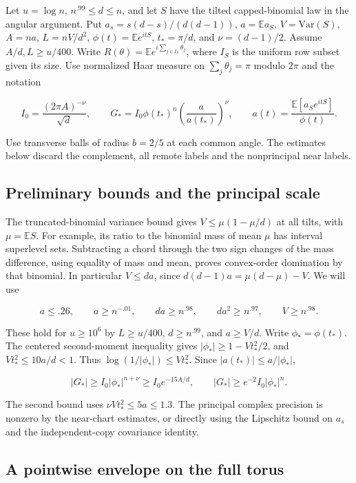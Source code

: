 \documentclass[11pt]{article}
\begin{document}
Let $u=\log n$, $n^{.99}\le d\le n$, and let $S$ have the tilted
capped-binomial law in the angular argument. Put
$a_s=s(d-s)/(d(d-1))$, $a=\mathbb E a_S$, $V=\mathrm{Var}(S)$,
$A=na$, $L=nV/d^2$, $\phi(t)=\mathbb E e^{itS}$,
$t_{\ast}=\pi/d$, and $\nu=(d-1)/2$. Assume
$A/d,L\ge u/400$.
Write $R(\theta)=\mathbb E e^{i\sum_{j\in I_S}\theta_j}$, where
$I_S$ is the uniform row subset given its size. Use normalized Haar
measure on $\sum_j\theta_j=\pi$ modulo $2\pi$ and the notation

\[
I_0=\frac{(2\pi A)^{-\nu}}{\sqrt d},\qquad
G_{\ast}=I_0\phi(t_{\ast})^n\left(\frac a{a(t_{\ast})}\right)^\nu,\qquad
a(t)=\frac{\mathbb E[a_S e^{itS}]}{\phi(t)} .
\]

Use transverse balls of radius $b=2/5$ at each common angle. The estimates below discard the complement, all remote labels and the nonprincipal near labels.

\subsection{Preliminary bounds and the principal scale}

The truncated-binomial variance bound gives
$V\le\mu(1-\mu/d)$ at all tilts, with $\mu=\mathbb ES$.
For example, its ratio to the binomial mass of mean $\mu$ has
interval superlevel sets. Subtracting a chord through the two
sign changes of the mass difference, using equality of mass
and mean, proves convex-order domination by that binomial.
In particular $V\le da$, since
$d(d-1)a=\mu(d-\mu)-V$. We will use

\[
a\le.26,\qquad a\ge n^{-.01},\qquad da\ge n^{.98},\qquad
da^2\ge n^{.97},\qquad V\ge n^{.98}.
\]

These hold for $u\ge10^6$ by $L\ge u/400$, $d\ge n^{.99}$,
and $a\ge V/d$. Write $\phi_{\ast}=\phi(t_{\ast})$.
The centered second-moment inequality gives
$|\phi_{\ast}|\ge1-Vt_{\ast}^2/2$, and $Vt_{\ast}^2\le10a/d<1$.
Thus $\log(1/|\phi_{\ast}|)\le Vt_{\ast}^2$. Since
$|a(t_{\ast})|\le a/|\phi_{\ast}|$,

\[
|G_{\ast}|\ge I_0|\phi_{\ast}|^{n+\nu}\ge I_0e^{-15A/d},
\qquad
|G_{\ast}|\ge e^{-2}I_0|\phi_{\ast}|^n .
\]

The second bound uses $\nu Vt_{\ast}^2\le5a\le1.3$.
The principal complex precision is nonzero by the near-chart
estimates, or directly using the Lipschitz bound on $a_s$
and the independent-copy covariance identity.

\subsection{A pointwise envelope on the full torus}
\end{document}
